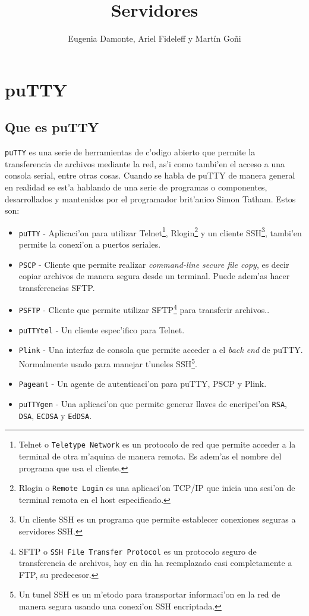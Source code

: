\documentclass[11pt]{article}
\title{\Huge Servidores}
\author{Eugenia Damonte, Ariel Fideleff y Mart\'in Go\~ni}
\date{}
\begin{document}
	\maketitle
	\newpage
	\tableofcontents
	\newpage
	
	
	\section{puTTY}
	\subsection{Que es puTTY}
		\texttt{puTTY} es una serie de herramientas de c'odigo abierto que permite la transferencia de archivos mediante la red, as'i como tambi'en el acceso a una consola serial, entre otras cosas. Cuando se habla de puTTY de manera general en realidad se est'a hablando de una serie de programas o componentes, desarrollados y mantenidos por el programador brit'anico Simon Tatham. Estos son:
		
		\begin{itemize}
			\item \texttt{puTTY} - Aplicaci'on para utilizar Telnet\footnote{Telnet o \texttt{Teletype Network} es un protocolo de red que permite acceder a la terminal de otra m'aquina de manera remota. Es adem'as el nombre del programa que usa el cliente.}, Rlogin\footnote{Rlogin o \texttt{Remote Login} es una aplicaci'on TCP/IP que inicia una sesi'on de terminal remota en el host especificado.} y un cliente SSH\footnote{Un cliente SSH es un programa que permite establecer conexiones seguras a servidores SSH.}, tambi'en permite la conexi'on a puertos seriales.
			\item \texttt{PSCP} - Cliente que permite realizar \textit{command-line secure file copy}, es decir copiar archivos de manera segura desde un terminal. Puede adem'as hacer transferencias SFTP.
			\item \texttt{PSFTP} - Cliente que permite utilizar SFTP\footnote{SFTP o \texttt{SSH File Transfer Protocol} es un protocolo seguro de transferencia de archivos, hoy en dia ha reemplazado casi completamente a FTP, su predecesor.} para transferir archivos..
			\item \texttt{puTTYtel} - Un cliente espec'ifico para Telnet.
			\item \texttt{Plink} - Una interfaz de consola que permite acceder a el \textit{back end} de puTTY. Normalmente usado para manejar t'uneles SSH\footnote{Un tunel SSH es un m'etodo para transportar informaci'on en la red de manera segura usando una conexi'on SSH encriptada.}.
			\item \texttt{Pageant} - Un agente de autenticaci'on para puTTY, PSCP y Plink.
			\item \texttt{puTTYgen} - Una aplicaci'on que permite generar llaves de encripci'on \texttt{RSA}, \texttt{DSA}, \texttt{ECDSA} y \texttt{EdDSA}.
		\end{itemize}
		
\end{document}
